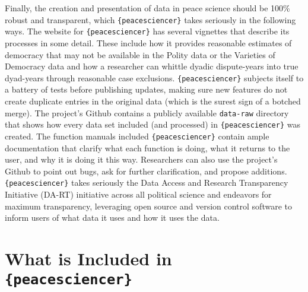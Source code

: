 \documentclass[
  11pt,
]{article}
\begin{document}
Finally, the creation and presentation of data in peace science should be 100\% robust and transparent, which \texttt{\{peacesciencer\}} takes seriously in the following ways. The website for \texttt{\{peacesciencer\}} has several vignettes that describe its processes in some detail. These include how it provides reasonable estimates of democracy that may not be available in the Polity data or the Varieties of Democracy data and how a researcher can whittle dyadic dispute-years into true dyad-years through reasonable case exclusions. \texttt{\{peacesciencer\}} subjects itself to a battery of tests before publishing updates, making sure new features do not create duplicate entries in the original data (which is the surest sign of a botched merge). The project's Github contains a publicly available \texttt{data-raw} directory that shows how every data set included (and processed) in \texttt{\{peacesciencer\}} was created. The function manuals included \texttt{\{peacesciencer\}} contain ample documentation that clarify what each function is doing, what it returns to the user, and why it is doing it this way. Researchers can also use the project's Github to point out bugs, ask for further clarification, and propose additions. \texttt{\{peacesciencer\}} takes seriously the Data Access and Research Transparency Initiative (DA-RT) initiative across all political science and endeavors for maximum transparency, leveraging open source and version control software to inform users of what data it uses and how it uses the data.

\hypertarget{what-is-included-in-peacesciencer}{%
\section{\texorpdfstring{What is Included in \texttt{\{peacesciencer\}}}{What is Included in \{peacesciencer\}}}\label{what-is-included-in-peacesciencer}}
\end{document}
